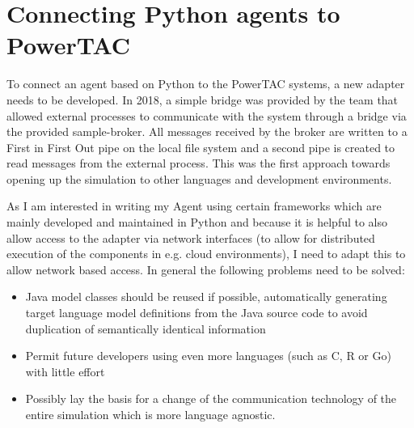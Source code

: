 \section{Connecting Python agents to PowerTAC}%
\label{sec:connecting_python_agents_to_powertac}



To connect an agent based on Python to the \ac{PowerTAC} systems, a new adapter needs to be developed. In 2018, a simple
bridge was provided by the team that allowed external processes to communicate with the system through a bridge via the
provided sample-broker. All messages received by the broker are written to a First in First Out pipe on the local file
system and a second pipe is created to read messages from the external process. This was the first approach towards
opening up the simulation to other languages and development environments. 

As I am interested in writing my Agent using certain frameworks which are mainly developed and maintained in Python and
because it is helpful to also allow access to the adapter via network interfaces (to allow for distributed execution of
the components in e.g. cloud environments), I need to adapt this to allow network based access. In general the following
problems need to be solved:

\begin{itemize} \item Java model classes should be reused if possible, automatically generating target language model
	definitions from the Java source code to avoid duplication of semantically identical information \item Permit
	future developers using even more languages (such as C, R or Go) with little effort \item Possibly lay the basis
	for a change of the communication technology of the entire simulation which is more language agnostic.
	\end{itemize}

